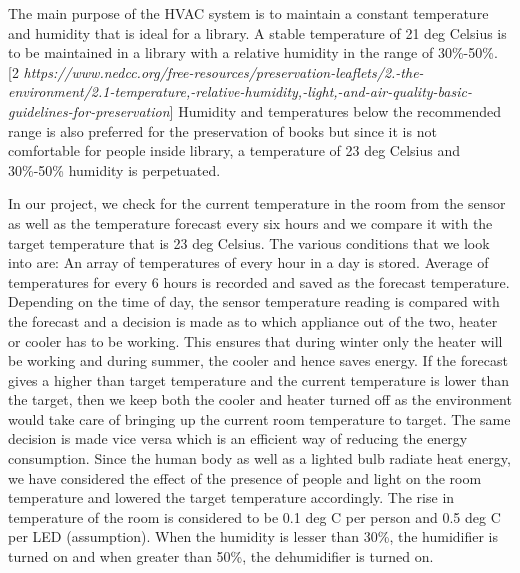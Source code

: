 \documentclass[runningheads]{llncs}
\begin{document}
The main purpose of the HVAC system is to maintain a constant temperature and humidity that is ideal for a library. A stable temperature of 21 deg Celsius is to be maintained in a library with a relative humidity in the range of 30\%-50\%. [2 \textit{https://www.nedcc.org/free-resources/preservation-leaflets/2.-the-environment/2.1-temperature,-relative-humidity,-light,-and-air-quality-basic\newline-guidelines-for-preservation}] Humidity and temperatures below the recommended range is also preferred for the preservation of books but since it is not comfortable for people inside library, a temperature of 23 deg Celsius and 30\%-50\% humidity is perpetuated.
\vspace{2mm}
\par In our project, we check for the current temperature in the room from the sensor as well as the temperature forecast every six hours and we compare it with the target temperature that is 23 deg Celsius. The various conditions that we look into are:
An array of temperatures of every hour in a day is stored. Average of temperatures for every 6 hours is recorded and saved as the forecast temperature. Depending on the time of day, the sensor temperature reading is compared with the forecast and a decision is made as to which appliance out of the two, heater or cooler has to be working. This ensures that during winter only the heater will be working and during summer, the cooler and hence saves energy. If the forecast gives a higher than target temperature and the current temperature is lower than the target, then we keep both the cooler and heater turned off as the environment would take care of bringing up the current room temperature to target. The same decision is made vice versa which is an efficient way of reducing the energy consumption.
Since the human body as well as a lighted bulb radiate heat energy, we have considered the effect of the presence of people and light on the room temperature and lowered the target temperature accordingly. The rise in temperature of the room is considered to be 0.1 deg C per person and 0.5 deg C per LED (assumption). When the humidity is lesser than 30\%, the humidifier is turned on and when greater than 50\%, the dehumidifier is turned on.
\end{document}
